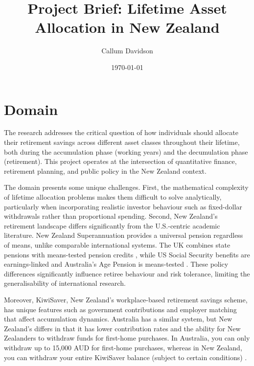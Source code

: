 \documentclass[11pt]{article}
\title{\textbf{Project Brief: Lifetime Asset Allocation in New Zealand}}
\author{Callum Davidson}
\date{\today}
\begin{document}
\maketitle

\section{Domain}

The research addresses the critical question of how individuals should allocate their retirement savings across different asset classes throughout their lifetime, both during the accumulation phase (working years) and the decumulation phase (retirement). This project operates at the intersection of quantitative finance, retirement planning, and public policy in the New Zealand context.

The domain presents some unique challenges. First, the mathematical complexity of lifetime allocation problems makes them difficult to solve analytically, particularly when incorporating realistic investor behaviour such as fixed-dollar withdrawals rather than proportional spending. Second, New Zealand's retirement landscape differs significantly from the U.S.-centric academic literature. New Zealand Superannuation provides a universal pension regardless of means, unlike comparable international systems. The UK combines state pensions with means-tested pension credits \parencite{ukgov2025pensionCredit,ukgovNDpensionExplained}, while US Social Security benefits are earnings-linked \parencite{ssa2025beniftsPDF} and Australia's Age Pension is means-tested \parencite{ausgov2025agePension}. These policy differences significantly influence retiree behaviour and risk tolerance, limiting the generalisability of international research.

Moreover, KiwiSaver, New Zealand's workplace-based retirement savings scheme, has unique features such as government contributions and employer matching that affect accumulation dynamics. Australia has a similar system, but New Zealand's differs in that it has lower contribution rates and the ability for New Zealanders to withdraw funds for first-home purchases. In Australia, you can only withdraw up to 15,000 AUD for first-home purchases, whereas in New Zealand, you can withdraw your entire KiwiSaver balance (subject to certain conditions) \parencite{firstsuper2025kiwisaverVsSuper}.
\end{document}
